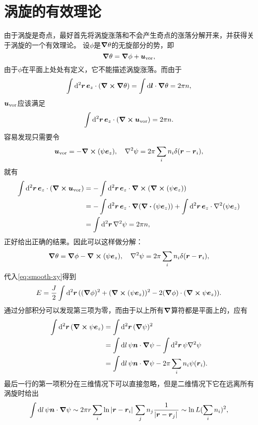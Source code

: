 \documentclass[hyperref, UTF8, a4paper]{ctexart}
\begin{document}
\section{涡旋的有效理论}

由于涡旋是奇点，最好首先将涡旋涨落和不会产生奇点的涨落分解开来，并获得关于涡旋的一个有效理论。
设$\phi$是$\grad{\theta}$的无旋部分的势，即
\[
    \grad{\theta} = \grad{\phi} + \vb*{u}_\text{vor},
\]
由于$\phi$在平面上处处有定义，它不能描述涡旋涨落。而由于
\[
    \int \dd[2]{\vb*{r}} \vb*{e}_z \cdot (\curl{\grad{\theta}}) = \int \dd{\vb*{l}} \cdot \grad{\theta} = 2\pi n, 
\]
$\vb*{u}_\text{vor}$应该满足
\[
    \int \dd[2]{\vb*{r}} \vb*{e}_z \cdot (\curl{\vb*{u}_\text{vor}}) = 2 \pi n.
\]
容易发现只需要令
\[
    \vb*{u}_\text{vor} = - \curl{(\psi \vb*{e}_z)}, \quad \laplacian{\psi} = 2\pi \sum_i n_i \delta(\vb*{r} - \vb*{r}_i),
\]
就有
\[
    \begin{aligned}
        \int \dd[2]{\vb*{r}} \vb*{e}_z \cdot (\curl{\vb*{u}_\text{vor}}) &= - \int \dd[2]{\vb*{r}} \vb*{e}_z \cdot \curl{(\curl{(\psi \vb*{e}_z)})} \\
        &= - \int \dd[2]{\vb*{r}} \vb*{e}_z \cdot \grad{(\div{(\psi \vb*{e}_z)})} + \int \dd[2]{\vb*{r}} \vb*{e}_z \cdot \laplacian (\psi \vb*{e}_z) \\
        &= \int \dd[2]{\vb*{r}} \laplacian{\psi} = 2 \pi n,
    \end{aligned}
\]
正好给出正确的结果。因此可以这样做分解：
\begin{equation}
    \grad{\theta} = \grad{\phi} - \curl{(\psi \vb*{e}_z)}, \quad \laplacian{\psi} = 2\pi \sum_i n_i \delta(\vb*{r} - \vb*{r}_i),
\end{equation}
代入\eqref{eq:smooth-xy}得到
\[
    E = \frac{J}{2} \int \dd[2]{\vb*{r}} ((\grad{\phi})^2 + (\curl{(\psi \vb*{e}_z)})^2 - 2 (\grad{\phi}) \cdot (\curl{\psi \vb*{e}_z})).
\]
通过分部积分可以发现第三项为零，而由于以上所有$\grad$算符都是平面上的，应有
\[
    \begin{aligned}
        \int \dd[2]{\vb*{r}} (\curl{\psi \vb*{e}_z}) &= \int \dd[2]{\vb*{r}} (\grad{\psi})^2 \\
        &= \int \dd{l} \psi \vb*{n} \cdot \grad{\psi}  - \int \dd[2]{\vb*{r}} \psi \laplacian{\psi} \\
        &= \int \dd{l} \psi \vb*{n} \cdot \grad{\psi} - 2\pi \sum_{i} n_i \psi(\vb*{r}_i).
    \end{aligned}
\]
最后一行的第一项积分在三维情况下可以直接忽略，但是二维情况下它在远离所有涡旋时给出
\[
    \int \dd{l} \psi \vb*{n} \cdot \grad{\psi} \sim 2\pi r \sum_i \ln \abs*{\vb*{r} - \vb*{r}_i} \sum_j n_j \frac{1}{\abs*{\vb*{r} - \vb*{r}_j}} \sim \ln L (\sum_i n_i)^2,
\]
\end{document}
